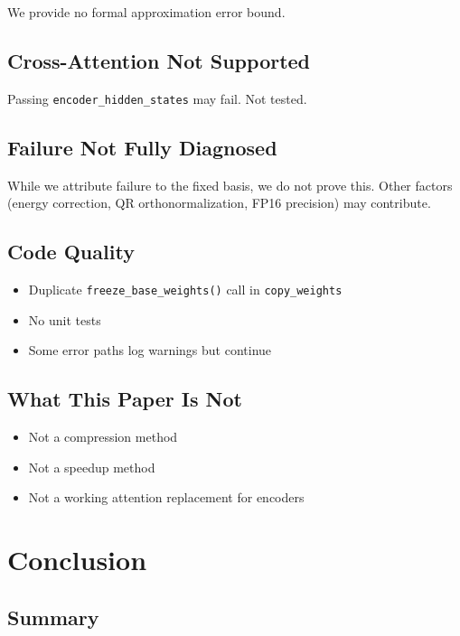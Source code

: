 We provide no formal approximation error bound.

\subsection{Cross-Attention Not Supported}

Passing \texttt{encoder\_hidden\_states} may fail. Not tested.

\subsection{Failure Not Fully Diagnosed}

While we attribute failure to the fixed basis, we do not prove this. Other 
factors (energy correction, QR orthonormalization, FP16 precision) may 
contribute.

\subsection{Code Quality}

\begin{itemize}
\item Duplicate \texttt{freeze\_base\_weights()} call in \texttt{copy\_weights}
\item No unit tests
\item Some error paths log warnings but continue

\end{itemize}
\subsection{What This Paper Is Not}

\begin{itemize}
\item Not a compression method
\item Not a speedup method
\item Not a working attention replacement for encoders

\end{itemize}



\section{Conclusion}

\subsection{Summary}

